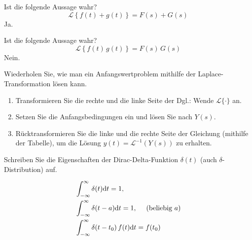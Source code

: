 {\begin{iii}
\item\item Ist die folgende Aussage wahr? $$\mathcal{L}\left\{f(t)+g(t)\right\} = F(s)+G(s)$$ Ja.

\item\item Ist die folgende Aussage wahr?
$$\mathcal{L}\left\{f(t)\,g(t)\right\} = F(s)\,G(s)$$ Nein.

\item Wiederholen Sie, wie man ein Anfangswertproblem mithilfe der Laplace-Transformation
lösen kann.
\renewcommand{\labelenumi}{\arabic{enumi}}
 \setcounter{enumi}{0}
\begin{enumerate}
\item Transformieren Sie die rechte und die linke Seite der Dgl.: Wende $\mathcal{L}\{\cdot\}$ an.
\item Setzen Sie die Anfangsbedingungen ein und lösen Sie nach $Y(s)$.
\item Rücktransformieren Sie die linke und die rechte Seite der Gleichung (mithilfe der Tabelle), um die Lösung $y(t)=\mathcal{L}^{-1}(Y(s))$ zu erhalten.
\end{enumerate}

\item Schreiben Sie die Eigenschaften der Dirac-Delta-Funktion $\delta(t)$ (auch $\delta$-Distribution) auf.

\begin{align*}
&\int_{-\infty}^\infty \delta(t) \mathrm{d} t = 1, \\
&\int_{-\infty}^\infty \delta(t-a) \mathrm{d} t = 1, \quad \text{ (beliebig } a)\\
&\int_{-\infty}^\infty \delta(t-t_0)\, f(t) \mathrm{d} t = f(t_0)\\
\end{align*}

\end{iii}

}



